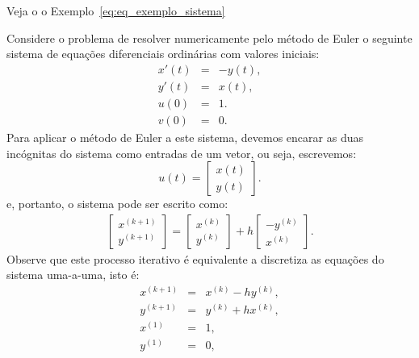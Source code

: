 Veja o  o Exemplo~\ref{eq:eq_exemplo_sistema}
\begin{ex}\label{ex:exemplo_sistema_PVI}Considere o problema de resolver numericamente pelo método de Euler o seguinte sistema de equações diferenciais ordinárias com valores iniciais:
\begin{subequations}\label{eq:eq_exemplo_sistema}
\begin{eqnarray}
x'(t)&=&-y(t),\\
y'(t)&=&x(t),\\
u(0)&=&1.\\
v(0)&=&0.
\end{eqnarray}
\end{subequations}
Para aplicar o método de Euler a este sistema, devemos encarar as duas incógnitas do sistema como entradas de um vetor, ou seja, escrevemos:
 \begin{equation} u(t)=\left[\begin{array}{c}x(t)\\y(t)\end{array}\right]. \end{equation}
 e, portanto, o sistema pode ser escrito como:
\begin{eqnarray}
\left[\begin{array}{c}x^{(k+1)}\\y^{(k+1)}\end{array}\right]=\left[\begin{array}{c}x^{(k)}\\y^{(k)}\end{array}\right]+h\left[\begin{array}{c}-y^{(k)}\\x^{(k)}\end{array}\right].
\end{eqnarray}
Observe que este processo iterativo é equivalente a discretiza as equações do sistema uma-a-uma, isto é:
\begin{eqnarray}
x^{(k+1)}&=&x^{(k)}-hy^{(k)},\\
y^{(k+1)}&=&y^{(k)}+hx^{(k)},\\
x^{(1)}&=&1,\\
y^{(1)}&=&0,\\
\end{eqnarray}
\end{ex}

